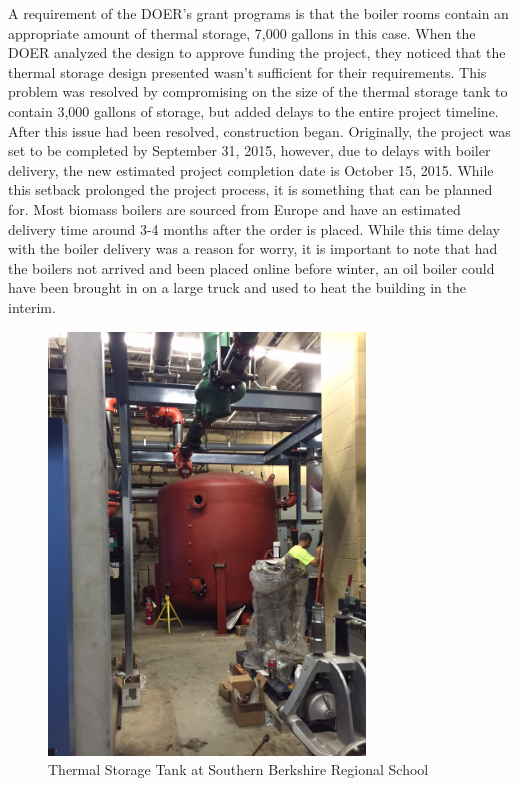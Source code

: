 \par A requirement of the DOER’s grant programs is that the boiler rooms contain an appropriate amount of thermal storage, 7,000 gallons in this case. When the DOER analyzed the design to approve funding the project, they noticed that the thermal storage design presented wasn’t sufficient for their requirements. This problem was resolved by compromising on the size of the thermal storage tank to contain 3,000 gallons of storage, but added delays to the entire project timeline. After this issue had been resolved, construction began. Originally, the project was set to be completed by September 31, 2015, however, due to delays with boiler delivery, the new estimated project completion date is October 15, 2015. While this setback prolonged the project process, it is something that can be planned for. Most biomass boilers are sourced from Europe and have an estimated delivery time around 3-4 months after the order is placed. While this time delay with the boiler delivery was a reason for worry, it is important to note that had the boilers not arrived and been placed online before winter, an oil boiler could have been brought in on a large truck and used to heat the building in the interim.
\begin{figure}[H]
\centering
\includegraphics[width=0.75\textwidth, angle=-90]{findingschapter/southernberkshirethermalstorage}
\caption{Thermal Storage Tank at Southern Berkshire Regional School}
\end{figure}

